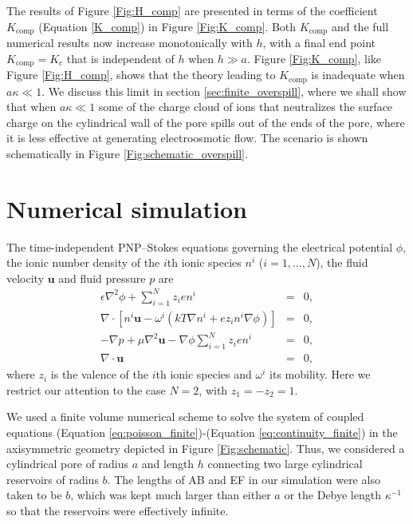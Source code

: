 The results of Figure \ref{Fig:H_comp}
are presented in terms of the coefficient $K_\text{comp}$
(Equation \ref{K_comp}) in Figure \ref{Fig:K_comp}. Both $K_\text{comp}$
and the full numerical results now increase monotonically with $h$,
with a final end point $K_\text{comp}=K_c$ that is independent of
$h$ when $h\gg a$. Figure \ref{Fig:K_comp}, like Figure \ref{Fig:H_comp},
shows that the theory leading to $K_\text{comp}$ is
inadequate when $a\kappa\ll 1$.
We discuss this limit in section \ref{sec:finite_overspill}, where
we shall show that when $a\kappa\ll 1$ some of the charge cloud of ions
that neutralizes the surface charge on the cylindrical wall of the pore
spills out of the ends of the pore, where it is less effective at generating
electroosmotic flow. The scenario is shown schematically in 
Figure \ref{Fig:schematic_overspill}.

\section{Numerical simulation}
\label{sec:finite_numerical}
The time-independent PNP--Stokes equations governing the electrical potential
$\phi$, the ionic number density of the $i$th ionic species $n^i$
($i=1,\dots,N$), the fluid velocity $\mathbf{u}$ and fluid pressure $p$
are
\begin{eqnarray}
\epsilon \nabla^2 \phi + \sum_{i=1}^{N} z_i e n^i & = & 0,
\label{eq:poisson_finite}
\\
\nabla\cdot\left\lbrack n^i\mathbf{u} -\omega^i(kT \nabla
n^i + ez_in^i\nabla\phi) \right\rbrack&=&0 ,
\label{eq:NP}
\\ 
-\nabla p + \mu \nabla^2 \mathbf{u} -  \nabla \phi \sum_{i=1}^{N} z_ien^i & = & 0, \label{eq:stokes_finite}\\
\nabla \cdot \mathbf{u} & = & 0, \label{eq:continuity_finite}
\end{eqnarray}
where $z_i$ is the valence of the $i$th ionic species and $\omega^i$
its mobility. Here we restrict our attention to the case
$N=2$, with $z_1=-z_2=1$.

We used a finite volume numerical scheme to
solve the system of coupled equations (Equation \ref{eq:poisson_finite})-(Equation \ref{eq:continuity_finite}) 
in the axisymmetric geometry depicted in Figure \ref{Fig:schematic}.
Thus, we considered a cylindrical pore of radius $a$ and length $h$ connecting two large cylindrical reservoirs of radius $b$. The lengths of AB and EF in our simulation were also taken to be $b$, which was kept much larger than either $a$ or the Debye length 
$\kappa^{-1}$ so that the reservoirs were effectively infinite.

